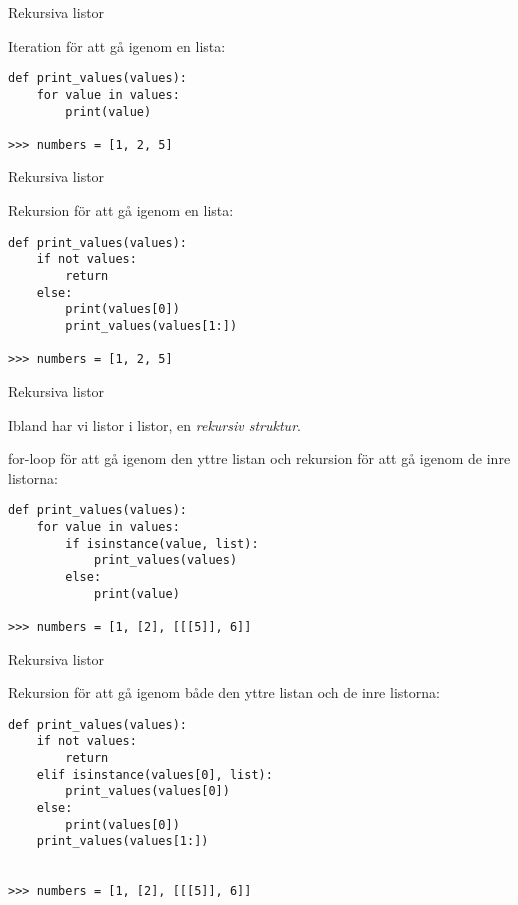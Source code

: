 \documentclass{beamer}
\begin{document}
  \begin{frame}[fragile]{Rekursiva listor}

    Iteration för att gå igenom en lista:

    \begin{verbatim}
def print_values(values):
    for value in values:
        print(value)

>>> numbers = [1, 2, 5]
    \end{verbatim}

  \end{frame}

  \begin{frame}[fragile]{Rekursiva listor}

    Rekursion för att gå igenom en lista:

    \begin{verbatim}
def print_values(values):
    if not values:
        return
    else:
        print(values[0])
        print_values(values[1:])

>>> numbers = [1, 2, 5]
    \end{verbatim}

  \end{frame}

  \begin{frame}[fragile]{Rekursiva listor}

    Ibland har vi listor i listor, en \emph{rekursiv struktur}.

    \pause{}

    for-loop för att gå igenom den yttre listan och rekursion för att gå igenom de inre listorna:

    \pause{}

    \begin{verbatim}
def print_values(values):
    for value in values:
        if isinstance(value, list):
            print_values(values)
        else:
            print(value)

>>> numbers = [1, [2], [[[5]], 6]]

    \end{verbatim}

  \end{frame}

  \begin{frame}[fragile]{Rekursiva listor}

    Rekursion för att gå igenom både den yttre listan och de inre listorna:

    \begin{verbatim}
def print_values(values):
    if not values:
        return
    elif isinstance(values[0], list):
        print_values(values[0])
    else:
        print(values[0])
    print_values(values[1:])


>>> numbers = [1, [2], [[[5]], 6]]

    \end{verbatim}

  \end{frame}
\end{document}
